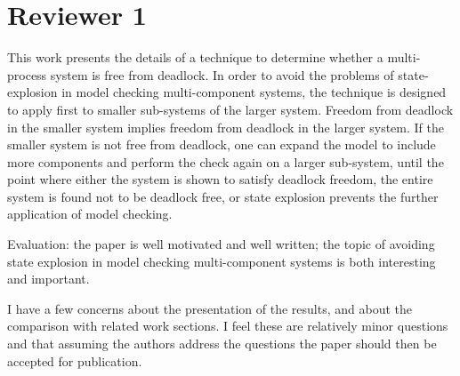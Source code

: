 \section{Reviewer 1}
This work presents the details of a technique to determine whether a multi-process 
system
is free from deadlock. In order to avoid the problems of state-explosion in model 
checking
multi-component systems, the technique is designed to apply first to smaller 
sub-systems
of the larger system. 
Freedom from deadlock in the smaller system implies freedom
from deadlock in the larger system.  If the smaller system is not free 
from deadlock,
one can expand the model to include more components and perform the check again on
a larger sub-system, until the point where either the system is shown to 
satisfy deadlock
freedom, the entire system is found not to be deadlock free,  
or state explosion prevents
the further application of model checking.


Evaluation: the paper is well motivated and well written; the topic of
avoiding state explosion in model checking multi-component systems
is both interesting and important.

I have a few concerns about the presentation of the results, and about the
comparison with related work sections.  I feel these are relatively minor
questions and that assuming the authors address the questions the paper should
then be accepted for publication.

